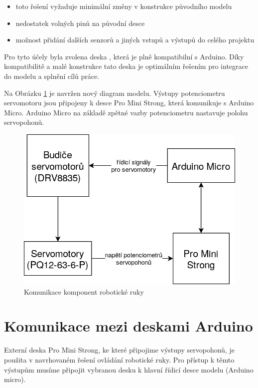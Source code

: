 \documentclass[thesis=B,czech]{FITthesis}[2012/06/26]
\begin{document}
\begin{itemize}
 \item toto řešení vyžaduje minimální změny v konstrukce původního modelu
 \item nedostatek volných pinů na původní desce
 \item možnost přidání dalších senzorů a jiných vstupů a výstupů do celého projektu
\end{itemize}
 
Pro tyto účely byla zvolena deska , která je plně kompatibilní s Arduino. Díky kompatibilitě a malé konstrukce tato deska je optimálním řešením pro integrace do modelu a splnění cílů práce. 


Na Obrázku \ref{fig:DesHandSch} je navržen nový diagram modelu. Výstupy potenciometru servomotoru jsou připojeny k desce Pro Mini Strong, která komunikuje s Arduino Micro. Arduino Micro na základě zpětné vazby potenciometru nastavuje polohu servopohonů.

\begin{figure}[H]
\centering
\includegraphics[scale=0.32]{./image/DesigneHandScheme.png}
\caption{Komunikace komponent robotické ruky}
\label{fig:DesHandSch}
\end{figure}


\section{Komunikace mezi deskami Arduino}

Externí deska Pro Mini Strong, ke které připojime výstupy servopohonů, je použita v navrhovaném řešení ovládání robotické ruky. Pro přístup k těmto výstupům musíme připojit vybranou desku k hlavní řídicí desce modelu (Arduino micro).
\end{document}
